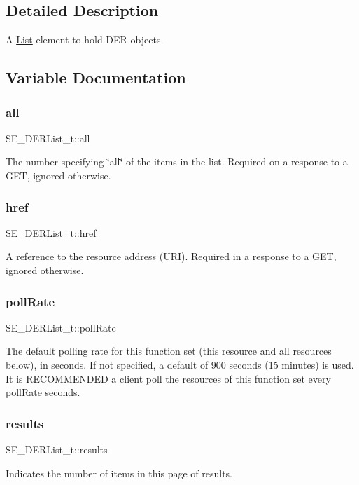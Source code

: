 \subsection{Detailed Description}
A \hyperlink{structList}{List} element to hold D\+ER objects. 

\subsection{Variable Documentation}
\mbox{\label{group__DERList_ga9aaa7fb12c771329499444b27f994150}} 
\subsubsection{\texorpdfstring{all}{all}}
{\footnotesize\ttfamily S\+E\+\_\+\+D\+E\+R\+List\+\_\+t\+::all}

The number specifying \char`\"{}all\char`\"{} of the items in the list. Required on a response to a G\+ET, ignored otherwise. \mbox{\label{group__DERList_gacfb770fdc796c21720ac7a361245ca9e}} 
\subsubsection{\texorpdfstring{href}{href}}
{\footnotesize\ttfamily S\+E\+\_\+\+D\+E\+R\+List\+\_\+t\+::href}

A reference to the resource address (U\+RI). Required in a response to a G\+ET, ignored otherwise. \mbox{\label{group__DERList_ga2b2db250d29172061ea81a3f2d88d190}} 
\subsubsection{\texorpdfstring{poll\+Rate}{pollRate}}
{\footnotesize\ttfamily S\+E\+\_\+\+D\+E\+R\+List\+\_\+t\+::poll\+Rate}

The default polling rate for this function set (this resource and all resources below), in seconds. If not specified, a default of 900 seconds (15 minutes) is used. It is R\+E\+C\+O\+M\+M\+E\+N\+D\+ED a client poll the resources of this function set every poll\+Rate seconds. \mbox{\label{group__DERList_ga54493ab9c3e5dd91709ef6fa49fdc70a}} 
\subsubsection{\texorpdfstring{results}{results}}
{\footnotesize\ttfamily S\+E\+\_\+\+D\+E\+R\+List\+\_\+t\+::results}

Indicates the number of items in this page of results. 